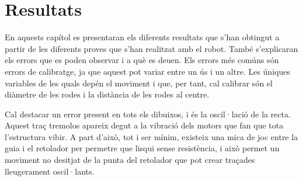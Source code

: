 \setlength\topmargin{8mm}
\onehalfspacing
\chapter{Resultats} %

\label{Chapter6} %


En aquests capítol es presentaran els diferents resultats que s'han obtingut a partir de les diferents proves que s'han realitzat amb el robot. També s'explicaran els errors que es poden observar i a què es deuen. Els errors més comúns són errors de calibratge, ja que aquest pot variar entre un ús i un altre. Les úniques variables de les quals depén el moviment i que, per tant, cal calibrar són el diàmetre de les rodes i la distància de les rodes al centre. 

Cal destacar un error present en tots els dibuixos, i és la oscil·lació de la recta. Aquest traç tremolos apareix degut a la vibració dels motors que fan que tota l'estructura vibir. A part d'això, tot i ser mínim, existeix una mica de joc entre la guia i el retolador per permetre que lisqui sense resistència, i això permet un moviment no desitjat de la punta del retolador que pot crear traçades lleugerament oscil·lants.

